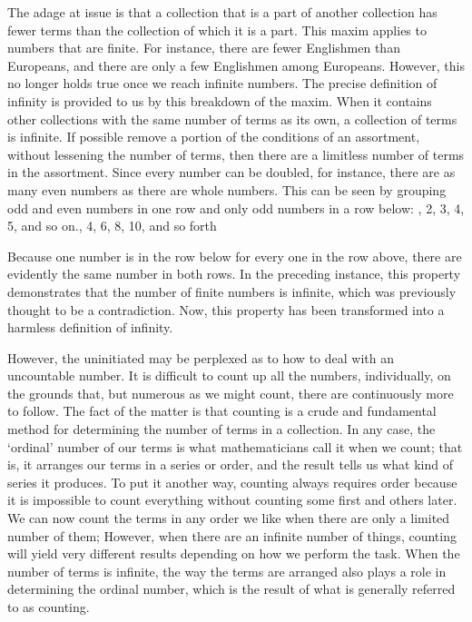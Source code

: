 \documentclass[a4paper,12pt]{book}[2004/02/16]
\theoremstyle{ilemma}
\theoremstyle{itheorem}
\theoremstyle{iother}
\theoremstyle{icorollary}
\theoremstyle{numcorollary}
\theoremstyle{idefinition}
\begin{document}
The adage at issue is that a collection that is a part of another collection has fewer terms than the collection of which it is a part. This maxim applies to numbers that are finite. For instance, there are fewer Englishmen than Europeans, and there are only a few Englishmen among Europeans. However, this no longer holds true once we reach infinite numbers. The precise definition of infinity is provided to us by this breakdown of the maxim. When it contains other collections with the same number of terms as its own, a collection of terms is infinite. If possible
remove a portion of the conditions of an assortment, without lessening the
number of terms, then there are a limitless number of terms in the
assortment. Since every number can be doubled, for instance, there are as many even numbers as there are whole numbers. This can be seen by grouping odd and even numbers in one row and only odd numbers in a row below: , 2, 3, 4, 5, and so on., 4, 6, 8, 10, and so forth

Because one number is in the row below for every one in the row above, there are evidently the same number in both rows. In the preceding instance, this property demonstrates that the number of finite numbers is infinite, which was previously thought to be a contradiction. Now, this property has been transformed into a harmless definition of infinity.

However, the uninitiated may be perplexed as to how to deal with an uncountable number. It is difficult to count up all the
numbers, individually, on the grounds that, but numerous as we might count, there are
continuously more to follow. The fact of the matter is that counting is a crude and fundamental method for determining the number of terms in a collection. In any case, the `ordinal' number of our terms is what mathematicians call it when we count; that is, it arranges our terms in a series or order, and the result tells us what kind of series it produces. To put it another way, counting always requires order because it is impossible to count everything without counting some first and others later. We can now count the terms in any order we like when there are only a limited number of them; However, when there are an infinite number of things, counting will yield very different results depending on how we perform the task. When the number of terms is infinite, the way the terms are arranged also plays a role in determining the ordinal number, which is the result of what is generally referred to as counting.
\end{document}
